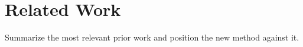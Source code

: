 \section{Related Work}

Summarize the most relevant prior work and position the new method against it.
